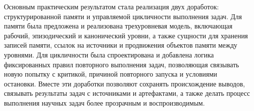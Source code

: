 Основным практическим результатом стала реализация двух доработок: структурированной памяти и управляемой цикличности выполнения задач. Для памяти была предложена и реализована трехуровневая модель, включающая рабочий, эпизодический и канонический уровни, а также сущности для хранения записей памяти, ссылок на источники и продвижения объектов памяти между уровнями. Для цикличности была спроектирована и добавлена логика фиксированных правил повторного выполнения задач, позволяющая связывать новую попытку с критикой, причиной повторного запуска и условиями остановки. Вместе эти доработки позволяют сохранять происхождение выводов, связывать результаты задач с источниками и артефактами, а также делать процесс выполнения научных задач более прозрачным и воспроизводимым.

